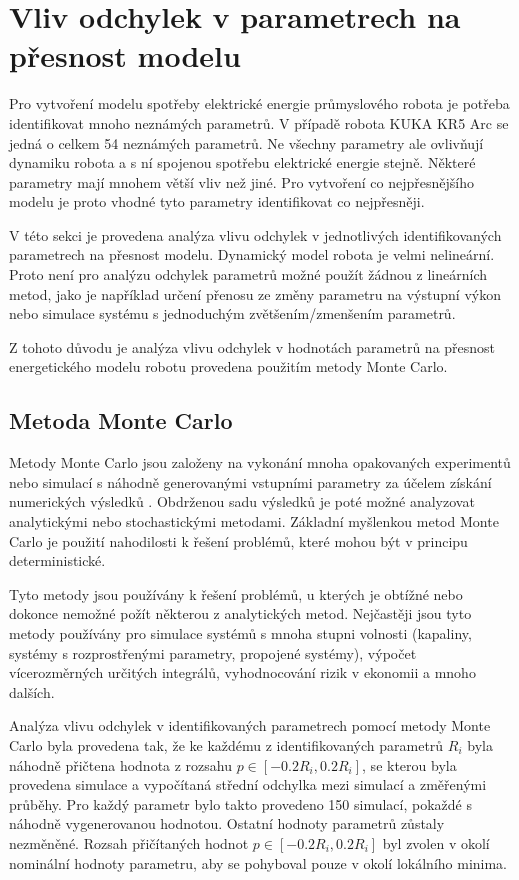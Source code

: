 \chapter{Vliv odchylek v parametrech na přesnost modelu}

Pro vytvoření modelu spotřeby elektrické energie průmyslového robota je potřeba identifikovat mnoho neznámých parametrů. V případě robota KUKA KR5 Arc se jedná o celkem 54 neznámých parametrů. Ne všechny parametry ale ovlivňují dynamiku robota a s ní spojenou spotřebu elektrické energie stejně. Některé parametry mají mnohem větší vliv než jiné. Pro vytvoření co nejpřesnějšího modelu je proto vhodné tyto parametry identifikovat co nejpřesněji. 

V této sekci je provedena analýza vlivu odchylek v jednotlivých identifikovaných parametrech na přesnost modelu. Dynamický model robota je velmi nelineární. Proto není pro analýzu odchylek parametrů možné použít žádnou z lineárních metod, jako je například určení přenosu ze změny parametru na výstupní výkon nebo simulace systému s jednoduchým zvětšením/zmenšením parametrů. 

Z tohoto důvodu je analýza vlivu odchylek v hodnotách parametrů na přesnost energetického modelu robotu provedena použitím metody Monte Carlo. 

\section{Metoda Monte Carlo}

Metody Monte Carlo jsou založeny na vykonání mnoha opakovaných experimentů nebo simulací s náhodně generovanými vstupními parametry za účelem získání numerických výsledků \cite{monte_carlo_ref}. Obdrženou sadu výsledků je poté možné analyzovat analytickými nebo stochastickými metodami. Základní myšlenkou metod Monte Carlo je použití nahodilosti k řešení problémů, které mohou být v principu deterministické.

Tyto metody jsou používány k řešení problémů, u kterých je obtížné nebo dokonce nemožné požít některou z analytických metod. Nejčastěji jsou tyto metody používány pro simulace systémů s mnoha stupni volnosti (kapaliny, systémy s rozprostřenými parametry, propojené systémy), výpočet vícerozměrných určitých integrálů, vyhodnocování rizik v ekonomii a mnoho dalších. 

Analýza vlivu odchylek v identifikovaných parametrech pomocí metody Monte Carlo byla provedena tak, že ke každému z identifikovaných parametrů $R_i$ byla náhodně přičtena hodnota z rozsahu $p \in [-0.2R_i,0.2R_i]$, se kterou byla provedena simulace a vypočítaná střední odchylka mezi simulací a změřenými průběhy. Pro každý parametr bylo takto provedeno 150 simulací, pokaždé s náhodně vygenerovanou hodnotou. Ostatní hodnoty parametrů zůstaly nezměněné. Rozsah přičítaných hodnot $p \in [-0.2R_i,0.2R_i]$ byl zvolen v okolí nominální hodnoty parametru, aby se pohyboval pouze v okolí lokálního minima.

